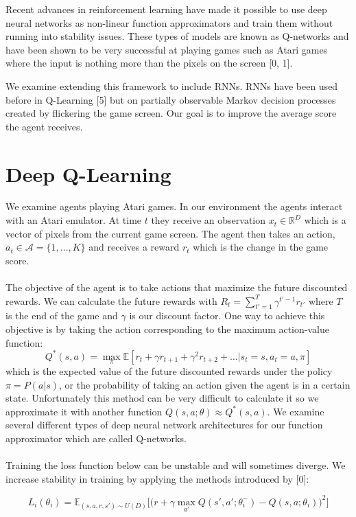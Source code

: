 \documentclass{article}
\begin{document}
Recent advances in reinforcement learning have made it possible to use deep
neural networks as non-linear function approximators and train them without
running into stability issues. These types of models are known as Q-networks and
have been shown to be very successful at playing games such as Atari games where
the input is nothing more than the pixels on the screen [0, 1].

We examine extending this framework to include RNNs. RNNs have been used before
in Q-Learning [5] but on partially observable Markov decision processes created
by flickering the game screen. Our goal is to improve the average score the agent
receives.

\section{Deep Q-Learning}

We examine agents playing Atari games. In our environment the agents interact with
an Atari emulator. At time $t$ they receive an observation $x_t \in \mathbb{R}^D$
which is a vector of pixels from the current game screen. The agent then takes an
action, $a_t \in \mathcal{A} = \{1, \dots, K\}$ and receives a reward $r_t$ which
is the change in the game score. \\
\\
The objective of the agent is to take actions that maximize the future discounted
rewards. We can calculate the future rewards with $R_t = \sum_{t' = 1}^T \gamma^{t'-1}r_{t'}$
where $T$ is the end of the game and $\gamma$ is our discount factor. One way
to achieve this objective is by taking the action corresponding to the maximum
action-value function:
$$Q^*(s,a) = \max_{\pi}\mathbb{E}[r_t + \gamma r_{t+1} + \gamma^2 r_{t+2} + \dots
|s_t = s, a_t = a, \pi]$$
which is the expected value of the future discounted rewards under the policy
$\pi = P(a|s)$, or the probability of taking an action given the agent is in a
certain state. Unfortunately this method can be very difficult to calculate it
so we approximate it with another function $Q(s,a;\theta) \approx Q^*(s,a)$. We
examine several different types of deep neural network architectures for our
function approximator which are called Q-networks. \\
\\
Training the loss function below can be unstable and will sometimes diverge.  We
increase stability in training by applying the methods introduced by [0]:

\begin{equation}
    L_i(\theta_i) = \mathbb{E}_{(s,a,r,s') \sim U(D)}\Big[\Big(
    r + \gamma \max_{a'}Q(s',a';\theta_i^-) - Q(s,a;\theta_i)\Big)^2\Big]
\end{equation}
\end{document}
